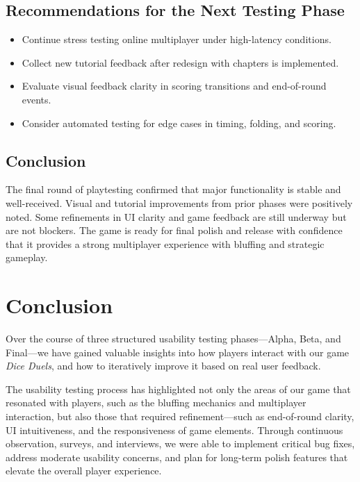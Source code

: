 \documentclass{article}
\begin{document}
\subsection{Recommendations for the Next Testing Phase}
\begin{itemize}
    \item Continue stress testing online multiplayer under high-latency conditions.
    \item Collect new tutorial feedback after redesign with chapters is implemented.
    \item Evaluate visual feedback clarity in scoring transitions and end-of-round events.
    \item Consider automated testing for edge cases in timing, folding, and scoring.
\end{itemize}

\subsection{Conclusion}
The final round of playtesting confirmed that major functionality is stable and well-received. Visual and tutorial improvements from prior phases were positively noted. Some refinements in UI clarity and game feedback are still underway but are not blockers. The game is ready for final polish and release with confidence that it provides a strong multiplayer experience with bluffing and strategic gameplay.

\newpage

\section{Conclusion}

Over the course of three structured usability testing phases—Alpha, Beta, and Final—we have gained valuable insights into how players interact with our game \textit{Dice Duels}, and how to iteratively improve it based on real user feedback.

The usability testing process has highlighted not only the areas of our game that resonated with players, such as the bluffing mechanics and multiplayer interaction, but also those that required refinement—such as end-of-round clarity, UI intuitiveness, and the responsiveness of game elements. Through continuous observation, surveys, and interviews, we were able to implement critical bug fixes, address moderate usability concerns, and plan for long-term polish features that elevate the overall player experience.
\end{document}
